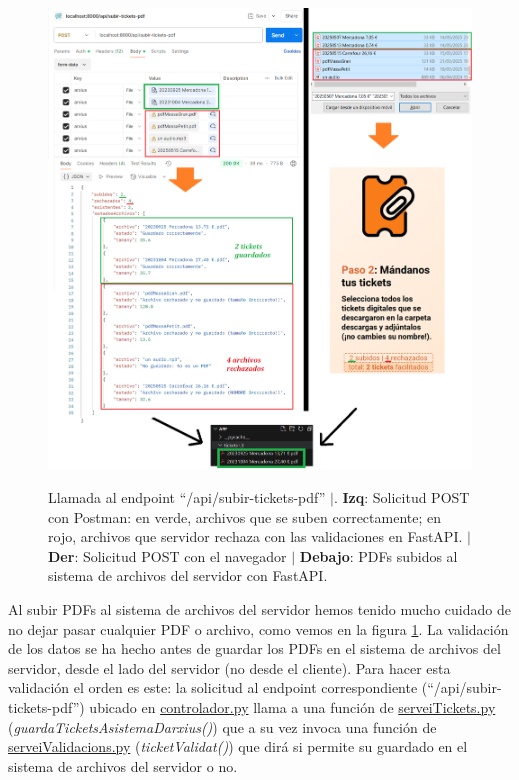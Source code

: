 \documentclass[a4paper,12pt]{report}
\begin{document}
	
	\FloatBarrier
	\setlength{\belowcaptionskip}{3pt}
	\begin{figure}[H]
		\centering
		\caption{Llamada al endpoint ``/api/subir-tickets-pdf'' $|$.\textbf{ Izq}: Solicitud POST con Postman: en verde, archivos que se suben correctamente; en rojo, archivos que servidor rechaza con las validaciones en FastAPI. $|$ \textbf{Der}: Solicitud POST con el navegador $|$ \textbf{Debajo}: PDFs subidos al sistema de archivos del servidor con FastAPI.}
		\includegraphics[width=1\linewidth]{img/validacionsArxiusPujadaEndpointTickets} 
		\label{fig:validacionsArxiusPujadaEndpointTickets}
	\end{figure}
	\FloatBarrier
	
	
	Al subir PDFs al sistema de archivos del servidor hemos tenido mucho cuidado de no dejar pasar cualquier PDF o archivo, como vemos en la figura \ref{fig:validacionsArxiusPujadaEndpointTickets}.
	La validación de los datos se ha hecho antes de guardar los PDFs en el sistema de archivos del servidor, desde el lado del servidor (no desde el cliente). Para hacer esta validación el orden es este: la solicitud al endpoint correspondiente (``/api/subir-tickets-pdf'') ubicado en \href{https://github.com/blackcub3s/mercApp/blob/main/APP%20WEB/__FastAPI__/app/controlador.py}{controlador.py} llama a una función de \href{https://github.com/blackcub3s/mercApp/blob/main/APP%20WEB/__FastAPI__/app/serveiTickets.py}{serveiTickets.py} (\textit{guardaTicketsAsistemaDarxius()}) que a su vez invoca una función de \href{https://github.com/blackcub3s/mercApp/blob/main/APP%20WEB/__FastAPI__/app/serveiValidacions.py}{serveiValidacions.py} (\textit{ticketValidat()}) que dirá si permite su guardado en el sistema de archivos del servidor o no.
	
\end{document}
